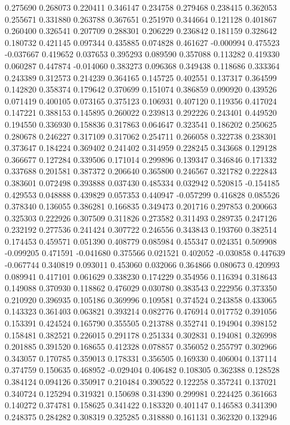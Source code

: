 0.275690
0.268073
0.220411
0.346147
0.234758
0.279468
0.238415
0.362053
0.255671
0.331880
0.263788
0.367651
0.251970
0.344664
0.121128
0.401867
0.260400
0.326541
0.207709
0.288301
0.206229
0.236842
0.181159
0.328642
0.180732
0.421145
0.097344
0.435885
0.074828
0.461627
-0.000994
0.475523
-0.037667
0.419652
0.037653
0.395293
0.089590
0.357088
0.113282
0.419330
0.060287
0.447874
-0.014060
0.383273
0.096368
0.349438
0.118686
0.333364
0.243389
0.312573
0.214239
0.364165
0.145725
0.402551
0.137317
0.364599
0.142820
0.358374
0.179642
0.370699
0.151074
0.386859
0.090920
0.439526
0.071419
0.400105
0.073165
0.375123
0.106931
0.407120
0.119356
0.417024
0.147221
0.388153
0.145895
0.260022
0.239813
0.292226
0.243401
0.449520
0.194550
0.336930
0.158836
0.317863
0.064647
0.323541
0.186202
0.250625
0.280678
0.246227
0.317109
0.317062
0.254711
0.266058
0.322738
0.238301
0.373647
0.184224
0.369402
0.241402
0.314959
0.228245
0.343668
0.129128
0.366677
0.127284
0.339506
0.171014
0.299896
0.139347
0.346846
0.171332
0.337688
0.201581
0.387372
0.206640
0.365800
0.246567
0.321782
0.222843
0.383601
0.072498
0.393888
0.037430
0.485334
0.032942
0.520815
-0.154185
0.429553
0.048888
0.439829
0.057353
0.440947
-0.057299
0.416828
0.085526
0.378340
0.136055
0.386281
0.166835
0.349473
0.201716
0.297853
0.200663
0.325303
0.222926
0.307509
0.311826
0.273582
0.311493
0.289735
0.247126
0.232192
0.277536
0.241424
0.307722
0.246556
0.343843
0.193760
0.382514
0.174453
0.459571
0.051390
0.408779
0.085984
0.455347
0.024351
0.509908
-0.099205
0.471591
-0.041680
0.375566
0.021521
0.402052
-0.030858
0.447639
-0.067744
0.340819
0.093011
0.453060
0.032066
0.364866
0.080673
0.420993
0.089941
0.417101
0.061629
0.338230
0.174229
0.354956
0.116394
0.318643
0.149088
0.370930
0.118862
0.476029
0.030780
0.383543
0.222956
0.373350
0.210920
0.396935
0.105186
0.369996
0.109581
0.374524
0.243858
0.433065
0.143323
0.361403
0.063821
0.393214
0.082776
0.476914
0.017752
0.391056
0.153391
0.424524
0.165790
0.355505
0.213788
0.352741
0.194904
0.398152
0.158481
0.382521
0.226015
0.291178
0.251334
0.302831
0.194081
0.326998
0.201885
0.391520
0.168655
0.412328
0.078857
0.356052
0.255797
0.302966
0.343057
0.170785
0.359013
0.178331
0.356505
0.169330
0.406004
0.137114
0.374759
0.150635
0.468952
-0.029404
0.406482
0.108305
0.362388
0.128528
0.384124
0.094126
0.350917
0.210484
0.390522
0.122258
0.357241
0.137021
0.340724
0.125294
0.319321
0.150698
0.314390
0.299981
0.224425
0.361663
0.140272
0.374781
0.158625
0.341422
0.183320
0.401147
0.146583
0.341390
0.248375
0.284282
0.308319
0.325285
0.318880
0.161131
0.362320
0.132946
